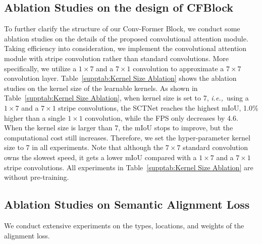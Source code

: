 \documentclass[letterpaper]{article} %
\def\ie{{\it{i.e.,~}}}
\begin{document}
\subsection{Ablation Studies on the design of CFBlock}
To further clarify the structure of our Conv-Former Block, we conduct some ablation studies on the details of the proposed convolutional attention module. Taking efficiency into consideration, we implement the convolutional attention module with stripe convolution rather than standard convolutions. More specifically, we utilize a $1 \times 7$ and a $7 \times 1$ convolution to approximate a $7 \times 7$ convolution layer. Table~\ref{supptab:Kernel Size Ablation} shows the ablation studies on the kernel size of the learnable kernels. As shown in Table~\ref{supptab:Kernel Size Ablation}, when kernel size is set to 7, \ie using a $1 \times 7$ and a $7 \times 1$ stripe convolutions, the SCTNet reaches the highest mIoU, 1.0\% higher than a single $1 \times 1$ convolution, while the FPS only decreases by 4.6. When the kernel size is larger than 7, the mIoU stops to improve, but the computational cost still increases. Therefore, we set the hyper-parameter kernel size to 7 in all experiments. Note that although the $7 \times 7$ standard convolution owns the slowest speed, it gets a lower mIoU compared with a $1 \times 7$ and a $7 \times 1$ stripe convolutions. All experiments in Table~\ref{supptab:Kernel Size Ablation} are without pre-training.




\subsection{Ablation Studies on Semantic Alignment Loss}
We conduct extensive experiments on the types, locations, and weights of the alignment loss. 
\end{document}
